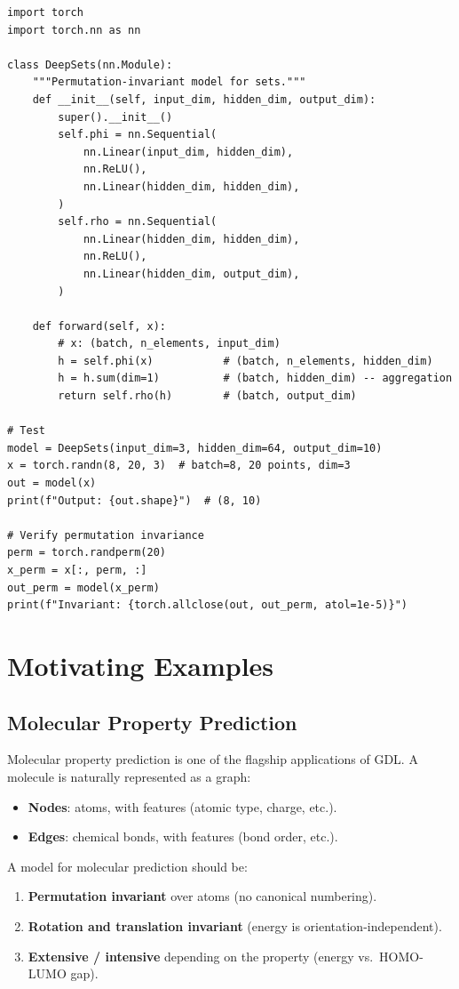 \begin{codeblock}[title=\textbf{Deep Sets implementation in PyTorch}]
\begin{verbatim}
import torch
import torch.nn as nn

class DeepSets(nn.Module):
    """Permutation-invariant model for sets."""
    def __init__(self, input_dim, hidden_dim, output_dim):
        super().__init__()
        self.phi = nn.Sequential(
            nn.Linear(input_dim, hidden_dim),
            nn.ReLU(),
            nn.Linear(hidden_dim, hidden_dim),
        )
        self.rho = nn.Sequential(
            nn.Linear(hidden_dim, hidden_dim),
            nn.ReLU(),
            nn.Linear(hidden_dim, output_dim),
        )

    def forward(self, x):
        # x: (batch, n_elements, input_dim)
        h = self.phi(x)           # (batch, n_elements, hidden_dim)
        h = h.sum(dim=1)          # (batch, hidden_dim) -- aggregation
        return self.rho(h)        # (batch, output_dim)

# Test
model = DeepSets(input_dim=3, hidden_dim=64, output_dim=10)
x = torch.randn(8, 20, 3)  # batch=8, 20 points, dim=3
out = model(x)
print(f"Output: {out.shape}")  # (8, 10)

# Verify permutation invariance
perm = torch.randperm(20)
x_perm = x[:, perm, :]
out_perm = model(x_perm)
print(f"Invariant: {torch.allclose(out, out_perm, atol=1e-5)}")
\end{verbatim}
\end{codeblock}

\section{Motivating Examples}

\subsection{Molecular Property Prediction}

Molecular property prediction is one of the flagship applications of GDL.
A molecule is naturally represented as a graph:
\begin{itemize}
    \item \textbf{Nodes}: atoms, with features (atomic type, charge, etc.).
    \item \textbf{Edges}: chemical bonds, with features (bond order, etc.).
\end{itemize}

\begin{proposition}
A model for molecular prediction should be:
\begin{enumerate}
    \item \textbf{Permutation invariant} over atoms (no canonical numbering).
    \item \textbf{Rotation and translation invariant} (energy is orientation-independent).
    \item \textbf{Extensive / intensive} depending on the property (energy vs.\ HOMO-LUMO gap).
\end{enumerate}
\end{proposition}

